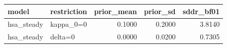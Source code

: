 \begin{tabular}{llrrr}
\toprule
model & restriction & prior\_mean & prior\_sd & sddr\_bf01 \\
\midrule
hsa\_steady & kappa\_0=0 & 0.1000 & 0.2000 & 3.8140 \\
hsa\_steady & delta=0 & 0.0000 & 0.0200 & 0.7305 \\
\bottomrule
\end{tabular}
